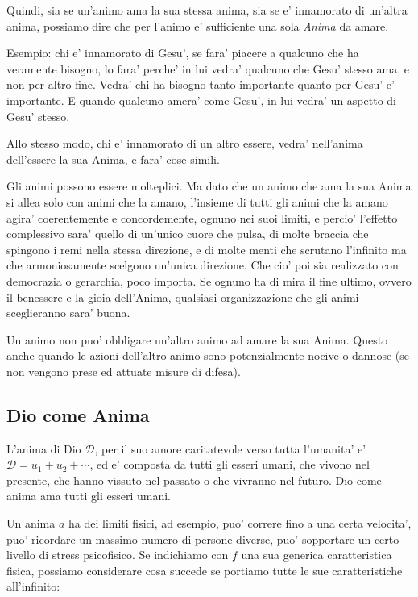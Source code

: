 Quindi, sia se un'animo ama la sua stessa anima, sia se e' innamorato di un'altra anima, possiamo dire che per l'animo e' sufficiente una sola \emph{Anima} da amare.

Esempio: chi e' innamorato di Gesu', se fara' piacere a qualcuno che ha veramente bisogno, lo fara' perche' in lui vedra' qualcuno che Gesu' stesso ama, e non per altro fine. Vedra' chi ha bisogno tanto importante quanto per Gesu' e' importante. E quando qualcuno amera' come Gesu', in lui vedra' un aspetto di Gesu' stesso.

Allo stesso modo, chi e' innamorato di un altro essere, vedra' nell'anima dell'essere la sua Anima, e fara' cose simili.

Gli animi possono essere molteplici. Ma dato che un animo che ama la sua Anima si allea solo con animi che la amano, l'insieme di tutti gli animi che la amano agira' coerentemente e concordemente, ognuno nei suoi limiti, e percio' l'effetto complessivo sara' quello di un'unico cuore che pulsa, di molte braccia che spingono i remi nella stessa direzione, e di molte menti che scrutano l'infinito ma che armoniosamente scelgono un'unica direzione. Che cio' poi sia realizzato con democrazia o gerarchia, poco importa. Se ognuno ha di mira il fine ultimo, ovvero il benessere e la gioia dell'Anima, qualsiasi organizzazione che gli animi sceglieranno sara' buona.

Un animo non puo' obbligare un'altro animo ad amare la sua Anima. Questo anche quando le azioni dell'altro animo sono potenzialmente nocive o dannose (se non vengono prese ed attuate misure di difesa).


\def\Dio{\mathcal{D}}

\subsection{Dio come Anima}
\label{PureSoulAsGod}
\label{SecondaDefinizioneDio}

L'anima di Dio $\Dio$, per il suo amore caritatevole verso tutta l'umanita' e' $\Dio=u_1+u_2+\cdots$, ed e' composta da tutti gli esseri umani, che vivono nel presente, che hanno vissuto nel passato o che vivranno nel futuro.
Dio come anima ama tutti gli esseri umani.

Un anima $a$ ha dei limiti fisici, ad esempio, puo' correre fino a una certa velocita', puo' ricordare un massimo numero di persone diverse, puo' sopportare un certo livello di stress psicofisico. Se indichiamo con $f$ una sua generica
caratteristica fisica, possiamo considerare cosa succede se portiamo tutte le sue caratteristiche all'infinito:

